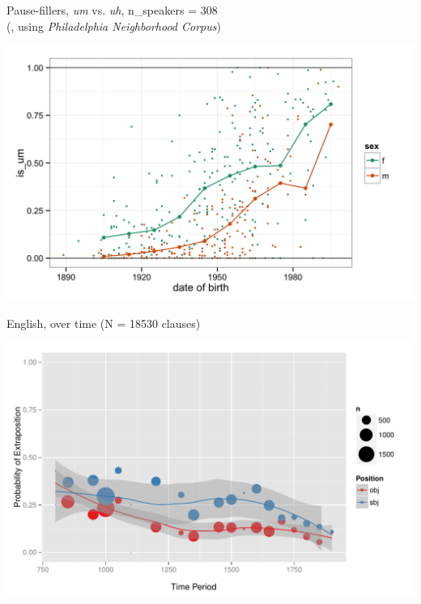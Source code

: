 \documentclass[hyperref={pdfpagelabels=false}]{beamer}
\begin{document}
\begin{frame}{Pause-fillers, \textsl{um} vs. \textsl{uh},  \small{n_{speakers} = 308}\\\small{(\citealt{fruehwald2015}, using \textsl{Philadelphia Neighborhood Corpus})} %
		}
		
		\includegraphics[width=1.16\textwidth]{um.png}
	
	
\end{frame}


\begin{frame}{English, over time (N = 18530 clauses)}

\begin{center}
\includegraphics[width=1.1\textwidth]{exSbjObjYearBinned50Loessymeb.pdf}
\end{center}
\end{frame}
\end{document}
